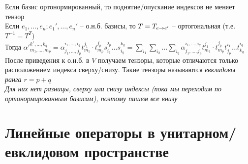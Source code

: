 \documentclass[12pt]{article}
\begin{document}
Если базис ортонормированный, то поднятие/опускание индексов не меняет тензор\\
Если $e_1, \ldots, e_n; e_1', \ldots, e_n'$ -- о.н.б. базисы, то $T = T_{e\rightarrow e'}$ -- ортогональная (т.е. $T^{-1} = T^T$)\\
Тогда $\alpha'^{k^1, \ldots, k_q}_{m_1,\ldots, m_p} = \alpha_{j_1, \ldots, j_p}^{i_1, \ldots, i_q} t^{j_1}_{m_1}\cdot t_{m_p}^{j_p} s_{i_1}^{j_p} \ldots s_{i_q}^{k_q} = \sum_{i_1}\sum_{i_2}\ldots\sum_{i_q} \alpha^{i_1,\ldots, i_q}_{j_1,\ldots, j_p} t^{j_1}_{m_1}\cdot t_{m_p}^{j_p} t^{i_1}_{j_p} \ldots t^{i_q}_{k_q}$\\
После приведения к о.н.б. в $V$ получаем тензоры, которые отличаются только расположением индекса сверху/снизу. Такие тензоры называются \it{евклидовы} ранга $r=p+q$\\
Для них нет разницы, сверху или снизу индексы (пока мы переходим по ортонормированным базисам), поэтому пишем все внизу
\section{Линейные операторы в унитарном/евклидовом пространстве}
\end{document}
